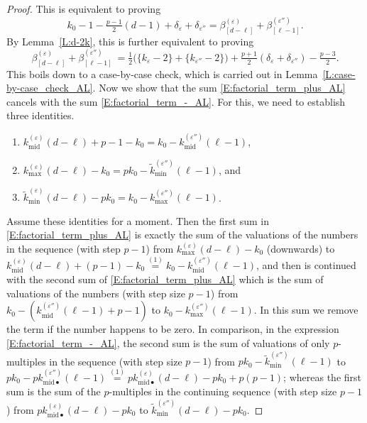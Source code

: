 \begin{proof}
    This is equivalent to proving
    $$ k_0-1-\tfrac{p-1}2 (d-1) +\delta_\varepsilon + \delta_{\varepsilon''} = \beta_{[d-\ell]}^{(\varepsilon)} + \beta_{[\ell-1]}^{(\varepsilon'')}. $$
    By Lemma~\ref{L:d-2k}, this is further equivalent to proving
    $$ \beta_{[d-\ell]}^{(\varepsilon)} + \beta_{[\ell-1]}^{(\varepsilon'')} \ =\tfrac12\big(\{k_\varepsilon - 2\} + \{k_{\varepsilon''}-2\} \big)  + \tfrac{p+1}2 (\delta_\varepsilon + \delta_{\varepsilon''}) -\tfrac{p-3}2. $$
    This boils down to a case-by-case check, which is carried out in Lemma~\ref{L:case-by-case_check_AL}.
    \medskip
    Now we show that the sum \eqref{E:factorial_term_plus_AL} cancels with the sum \eqref{E:factorial_term_-_AL}.
    For this, we need to establish three identities.
    \begin{enumerate}
    \item $k_{\mathrm{mid}}^{(\varepsilon)} (d-\ell)+p-1 -k_0 =k_0- k_{{\mathrm{mid}}}^{(\varepsilon'')}(\ell-1)$,
    \item $k_{\max}^{(\varepsilon)} (d-\ell) -k_0 = pk_0-\tilde  k_{\min}^{(\varepsilon'')}(\ell-1)$, and
    \item $ \tilde k_{\min}^{(\varepsilon)} (d-\ell) -pk_0=k_0-   k_{\max}^{(\varepsilon'')}(\ell-1) $.
    \end{enumerate}
    Assume these identities for a moment.
    Then the first sum in \eqref{E:factorial_term_plus_AL} is exactly the sum of the valuations of the numbers in the sequence (with step $p-1$) from $ k^{(\varepsilon)}_{\max}(d-\ell) - k_0$ (downwards) to $k^{(\varepsilon)}_{{\mathrm{mid}}}(d-\ell)+(p-1) - k_0 \stackrel{(1)}= k_0 - k_{{{\mathrm{mid}}}}^{(\varepsilon'')}(\ell-1)$, and then is continued with the second sum of \eqref{E:factorial_term_plus_AL} which is the sum of valuations of the numbers (with step size $p-1$) from $k_0 -(k_{{{\mathrm{mid}}}}^{(\varepsilon'')}(\ell-1)+p-1)$ to $k_0 - k_{\max}^{(\varepsilon'')}(\ell-1)$.
    In this sum we remove the term if the number happens to be zero.
    In comparison, in the expression \eqref{E:factorial_term_-_AL}, the second sum is the sum of valuations of only $p$-multiples in the sequence (with step size $p-1$) from $pk_0-\tilde  k_{\min}^{(\varepsilon'')}(\ell-1)$ to $pk_0 - pk^{(\varepsilon'')}_{{\mathrm{mid}}\bullet}(\ell-1)  \stackrel{(1)}=  pk^{(\varepsilon)}_{{\mathrm{mid}}\bullet}(d-\ell) - pk_0 + p(p-1)$; whereas the first sum is the sum of the $p$-multiples in the continuing sequence (with step size $p-1$) from $ pk^{(\varepsilon)}_{{\mathrm{mid}}\bullet}(d-\ell) - pk_0$ to $\tilde k^{(\varepsilon'')}_{\min}(d-\ell) - pk_0$.

\end{proof}

